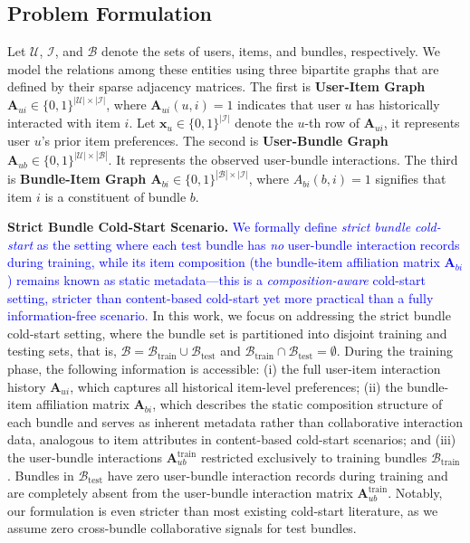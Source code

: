 \documentclass[lettersize,journal]{IEEEtran}
\newcommand{\revise}[1]{\textcolor{blue}{#1}}
\begin{document}
\subsection{Problem Formulation}
Let $\mathcal{U}$, $\mathcal{I}$, and $\mathcal{B}$ denote the sets of users, items, and bundles, respectively. We model the relations among these entities using three bipartite graphs that are defined by their sparse adjacency matrices. The first is \textbf{User-Item Graph $\mathbf{A}_{ui} \in \{0,1\}^{|\mathcal{U}| \times |\mathcal{I}|}$}, where $\mathbf{A}_{ui}(u,i)=1$ indicates that user $u$ has historically interacted with item $i$. Let $\mathbf{x}_u \in \{0,1\}^{|\mathcal{I}|}$ denote the $u$-th row of $\mathbf{A}_{ui}$, it represents user $u$'s prior item preferences. The second is \textbf{User-Bundle Graph $\mathbf{A}_{ub} \in \{0,1\}^{|\mathcal{U}| \times |\mathcal{B}|}$}. It represents the observed user-bundle interactions. The third is \textbf{Bundle-Item Graph $\mathbf{A}_{bi} \in \{0,1\}^{|\mathcal{B}| \times |\mathcal{I}|}$}, where $A_{bi}(b,i)=1$ signifies that item $i$ is a constituent of bundle $b$.

\noindent \textbf{Strict Bundle Cold-Start Scenario.}
\revise{We formally define \emph{strict bundle cold-start} as the setting where each test bundle has \emph{no} user-bundle interaction records during training, while its item composition (the bundle-item affiliation matrix $\mathbf{A}_{bi}$) remains known as static metadata---this is a \emph{composition-aware} cold-start setting, stricter than content-based cold-start yet more practical than a fully information-free scenario.} In this work, we focus on addressing the strict bundle cold-start setting, where the bundle set is partitioned into disjoint training and testing sets, that is, $\mathcal{B} = \mathcal{B}_{\text{train}} \cup \mathcal{B}_{\text{test}}$ and $\mathcal{B}_{\text{train}} \cap \mathcal{B}_{\text{test}} = \emptyset$.
During the training phase, the following information is accessible: (i) the full user-item interaction history $\mathbf{A}_{ui}$, which captures all historical item-level preferences; (ii) the bundle-item affiliation matrix $\mathbf{A}_{bi}$, which describes the static composition structure of each bundle and serves as inherent metadata rather than collaborative interaction data, analogous to item attributes in content-based cold-start scenarios; and (iii) the user-bundle interactions $\mathbf{A}_{ub}^{\text{train}}$ restricted exclusively to training bundles $\mathcal{B}_{\text{train}}$. Bundles in $\mathcal{B}_{\text{test}}$ have zero user-bundle interaction records during training and are completely absent from the user-bundle interaction matrix $\mathbf{A}_{ub}^{\text{train}}$. Notably, our formulation is even stricter than most existing cold-start literature, as we assume zero cross-bundle collaborative signals for test bundles.
\end{document}
